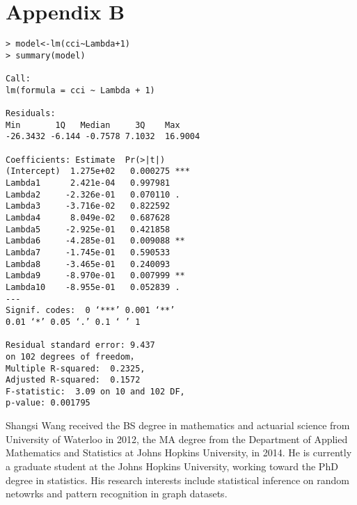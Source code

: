 \documentclass[10pt,journal,compsoc]{IEEEtran}
\begin{document}
\section*{Appendix B}
\begin{lstlisting}
> model<-lm(cci~Lambda+1)
> summary(model)

Call:
lm(formula = cci ~ Lambda + 1)

Residuals:
Min       1Q   Median     3Q    Max 
-26.3432 -6.144 -0.7578 7.1032  16.9004 

Coefficients: Estimate  Pr(>|t|)    
(Intercept)  1.275e+02   0.000275 ***
Lambda1      2.421e-04   0.997981    
Lambda2     -2.326e-01   0.070110 .  
Lambda3     -3.716e-02   0.822592    
Lambda4      8.049e-02   0.687628    
Lambda5     -2.925e-01   0.421858    
Lambda6     -4.285e-01   0.009088 ** 
Lambda7     -1.745e-01   0.590533    
Lambda8     -3.465e-01   0.240093    
Lambda9     -8.970e-01   0.007999 ** 
Lambda10    -8.955e-01   0.052839 .  
---
Signif. codes:  0 ‘***’ 0.001 ‘**’ 
0.01 ‘*’ 0.05 ‘.’ 0.1 ‘ ’ 1

Residual standard error: 9.437 
on 102 degrees of freedom，
Multiple R-squared:  0.2325,
Adjusted R-squared:  0.1572 
F-statistic:  3.09 on 10 and 102 DF,  
p-value: 0.001795
\end{lstlisting}


%
%
%






\vspace{-10 mm}
\begin{IEEEbiography}{Shangsi Wang}
	received the BS degree in mathematics and actuarial science from
	University of Waterloo in 2012, the MA degree from the Department of Applied Mathematics and Statistics at Johns Hopkins University, in 2014.  He is currently a graduate student at the Johns Hopkins University, working toward the PhD degree in statistics. His research interests include statistical inference on random netowrks and pattern recognition in graph datasets.
\end{IEEEbiography}
\end{document}
